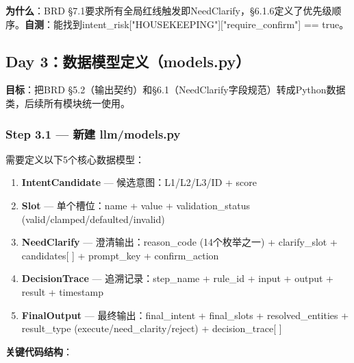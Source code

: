 \documentclass[12pt,a4paper]{ctexart}
\begin{document}
\textbf{为什么}：BRD §7.1要求所有全局红线触发即NeedClarify，§6.1.6定义了优先级顺序。\textbf{自测}：能找到intent\_risk["HOUSEKEEPING"]["require\_confirm"] == true。

\newpage

\subsection{Day 3：数据模型定义（models.py）}

\textbf{目标}：把BRD §5.2（输出契约）和§6.1（NeedClarify字段规范）转成Python数据类，后续所有模块统一使用。

\subsubsection*{Step 3.1 — 新建 llm/models.py}

需要定义以下5个核心数据模型：

\begin{enumerate}
    \item \textbf{IntentCandidate} — 候选意图：L1/L2/L3/ID + score
    \item \textbf{Slot} — 单个槽位：name + value + validation\_status (valid/clamped/defaulted/invalid)
    \item \textbf{NeedClarify} — 澄清输出：reason\_code (14个枚举之一) + clarify\_slot + candidates[ ] + prompt\_key + confirm\_action
    \item \textbf{DecisionTrace} — 追溯记录：step\_name + rule\_id + input + output + result + timestamp
    \item \textbf{FinalOutput} — 最终输出：final\_intent + final\_slots + resolved\_entities + result\_type (execute/need\_clarity/reject) + decision\_trace[ ]
\end{enumerate}

\textbf{关键代码结构}：
\end{document}
